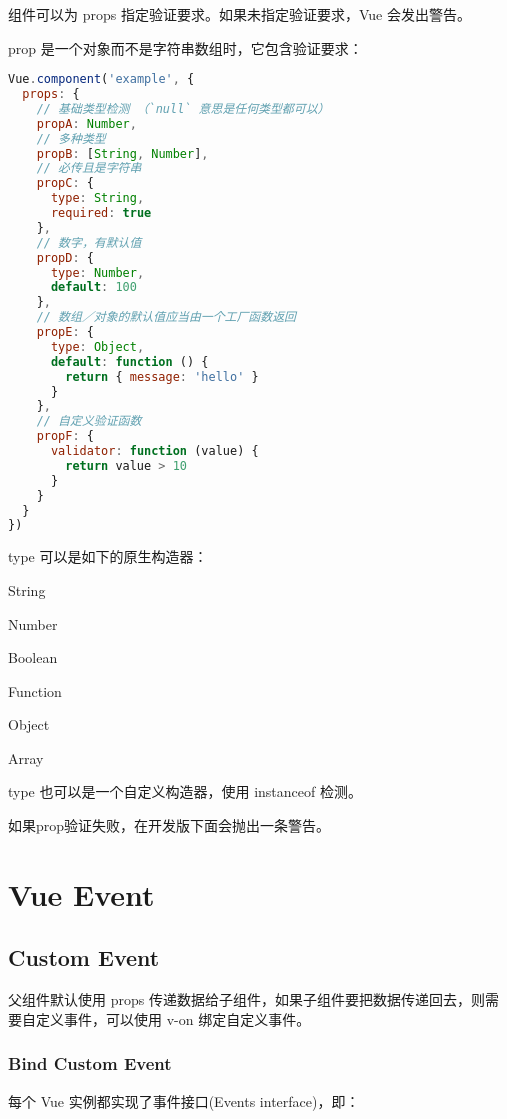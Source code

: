 组件可以为 props 指定验证要求。如果未指定验证要求，Vue 会发出警告。


prop 是一个对象而不是字符串数组时，它包含验证要求：



\begin{lstlisting}[language=JavaScript]
Vue.component('example', {
  props: {
    // 基础类型检测 （`null` 意思是任何类型都可以）
    propA: Number,
    // 多种类型
    propB: [String, Number],
    // 必传且是字符串
    propC: {
      type: String,
      required: true
    },
    // 数字，有默认值
    propD: {
      type: Number,
      default: 100
    },
    // 数组／对象的默认值应当由一个工厂函数返回
    propE: {
      type: Object,
      default: function () {
        return { message: 'hello' }
      }
    },
    // 自定义验证函数
    propF: {
      validator: function (value) {
        return value > 10
      }
    }
  }
})
\end{lstlisting}

type 可以是如下的原生构造器：

\begin{compactitem}
\item String
\item Number
\item Boolean
\item Function
\item Object
\item Array
\end{compactitem}

type 也可以是一个自定义构造器，使用 instanceof 检测。

如果prop验证失败，在开发版下面会抛出一条警告。

\chapter{Vue Event}

\section{Custom Event}


父组件默认使用 props 传递数据给子组件，如果子组件要把数据传递回去，则需要自定义事件，可以使用 v-on 绑定自定义事件。


\subsection{Bind Custom Event}

每个 Vue 实例都实现了事件接口(Events interface)，即：

